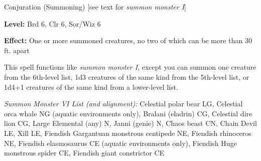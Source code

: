 
Conjuration (Summoning) [see text for \textit{summon monster I}]

\textbf{Level:} Brd 6, Clr 6, Sor/Wiz 6

\textbf{Effect:} One or more summoned creatures, no two of which can be more than 
30 ft. apart

This spell functions like \textit{summon monster I}, except you can summon one 
creature from the 6th-level list, 1d3 creatures of the same kind from the 5th-level 
list, or 1d4+1 creatures of the same kind from a lower-level list.

\textit{Summon Monster VI List (and alignment):} Celestial polar bear LG, Celestial orca whale NG (aquatic environments only), Bralani (eladrin) CG, Celestial dire lion CG, Large Elemental (any) N, Janni (genie) N, Chaos beast CN, Chain Devil LE, Xill LE, Fiendish Gargantuan monstrous centipede NE, Fiendish rhinoceros NE, Fiendish elasmosaurus CE (aquatic environments only), Fiendish Huge monstrous spider CE, Fiendish giant constrictor CE
